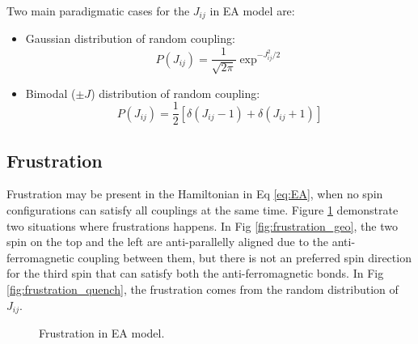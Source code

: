 Two main paradigmatic cases for the $J_{ij}$ in EA model are:
\begin{itemize}
\item Gaussian distribution of random coupling:
  \begin{equation}
    \label{eq:Jij_Gaussian}
    P(J_{ij})=\frac{1}{\sqrt{2\pi}}\exp^{-J_{ij}^2/2}
  \end{equation}
\item Bimodal ($\pm J$) distribution of random coupling:
  \begin{equation}
    \label{eq:Jij_bimodal}
    P(J_{ij})=\frac{1}{2}[\delta(J_{ij}-1)+\delta(J_{ij}+1)]
  \end{equation}
\end{itemize}

\subsection{Frustration}
\label{sec:frustration}
Frustration may be present in the Hamiltonian in Eq \ref{eq:EA}, when no spin 
configurations can satisfy all couplings at the same time. 
Figure \ref{fig:frustration} demonstrate two situations where frustrations 
happens. In Fig \ref{fig:frustration_geo}, the two spin on the top and the left
are anti-parallelly aligned due to the anti-ferromagnetic coupling between them,
but there is not an preferred spin direction for the third spin that can satisfy
both the anti-ferromagnetic bonds. In Fig \ref{fig:frustration_quench}, the 
frustration comes from the random distribution of $J_{ij}$. 

\begin{figure}
  \centering
  \hspace{0.5cm}
  \caption{Frustration in EA model.}
  \label{fig:frustration}
\end{figure}

